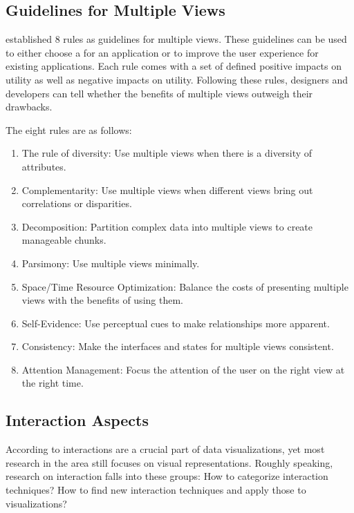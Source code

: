 \subsection{Guidelines for Multiple Views}\label{sec:related-work:guidelines}
\textcite{Baldonado2000} established 8 rules as guidelines for multiple views.
These guidelines can be used to either choose a \cmv{} for an application or to improve the user experience for existing \cmv{} applications.
Each rule comes with a set of defined positive impacts on utility as well as negative impacts on utility.
Following these rules, designers and developers can tell whether the benefits of multiple views outweigh their drawbacks.

The eight rules are as follows:
\begin{enumerate}
  \item
    The rule of diversity: Use multiple views when there is a diversity of attributes.
  \item
    Complementarity: Use multiple views when different views bring out correlations or disparities.
  \item
    Decomposition: Partition complex data into multiple views to create manageable chunks.
  \item
    Parsimony: Use multiple views minimally.
  \item
    Space/Time Resource Optimization: Balance the costs of presenting multiple views with the benefits of using them.
  \item
    Self-Evidence: Use perceptual cues to make relationships more apparent.
  \item
    Consistency: Make the interfaces and states for multiple views consistent.
  \item
    Attention Management: Focus the attention of the user on the right view at the right time.
\end{enumerate}



\subsection{Interaction Aspects}\label{sec:related-work:interaction-aspects}
According to \textcite{Ho2013} interactions are a crucial part of data visualizations, yet most research in the area still focuses on visual representations.
Roughly speaking, research on interaction falls into these groups:
How to categorize interaction techniques?
How to find new interaction techniques and apply those to visualizations?


